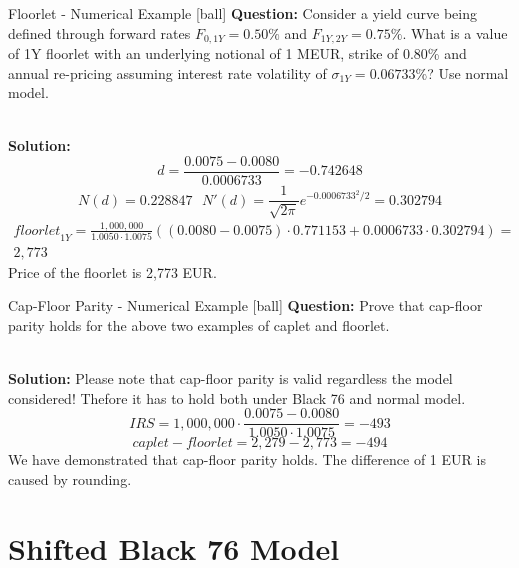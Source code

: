 \documentclass{beamer}
\begin{document}
\begin{frame}{Floorlet - Numerical Example}
[ball]
\textbf{Question:}
Consider a yield curve being defined through forward rates $F_{0, 1Y} = 0.50\%$ and $F_{1Y, 2Y} = 0.75\%$. What is a value of 1Y floorlet with an underlying notional of 1 MEUR, strike of 0.80\% and annual re-pricing assuming interest rate volatility of $\sigma_{1Y} = 0.06733\%$? Use normal model.

\mbox{}\\
\textbf{Solution:}
\begin{equation}
d = \frac{0.0075 - 0.0080}{0.0006733} = -0.742648
\end{equation}
\begin{equation}
N(d) = 0.228847 ~~~ N'(d) = \frac{1}{\sqrt{2 \pi}}e^{-0.0006733^2/2} = 0.302794
\end{equation}
\begin{multline}
\textit{floorlet}_{1Y} = \frac{1,000,000}{1.0050 \cdot 1.0075}\left((0.0080 - 0.0075) \cdot 0.771153 + 0.0006733 \cdot 0.302794 \right)=\\
2,773
\end{multline}
Price of the floorlet is 2,773 EUR.
\end{frame}

\begin{frame}{Cap-Floor Parity - Numerical Example}
[ball]
\textbf{Question:}
Prove that cap-floor parity holds for the above two examples of caplet and floorlet.

\mbox{}\\
\textbf{Solution:}
Please note that cap-floor parity is valid regardless the model considered! Thefore it has to hold both under Black 76 and normal model.
\begin{equation}
IRS = 1,000,000 \cdot \frac{0.0075 - 0.0080}{1.0050 \cdot 1.0075} = -493
\end{equation}
\begin{equation}
caplet - floorlet = 2,279 - 2,773 = -494
\end{equation}
We have demonstrated that cap-floor parity holds. The difference of 1 EUR is caused by rounding.
\end{frame}

\section{Shifted Black 76 Model}
\end{document}
